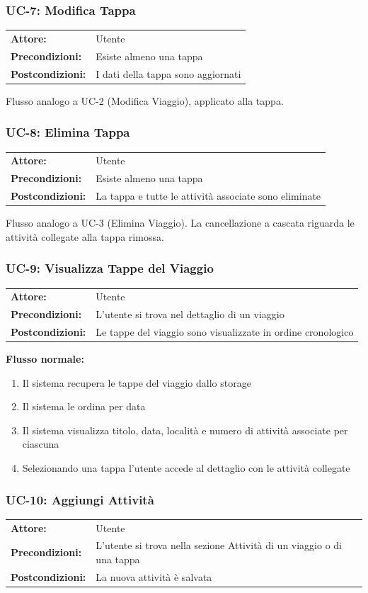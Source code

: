 \documentclass[12pt, a4paper]{article}
\makeatletter
\newcommand{\ucblock}[3]{%
  \noindent
  \begin{tabular}{@{}ll@{}}
    \textbf{Attore:}         & #1 \\
    \textbf{Precondizioni:}  & #2 \\
    \textbf{Postcondizioni:} & #3 \\
  \end{tabular}%
  \medskip
}
\makeatother
\begin{document}
\subsubsection{UC-7: Modifica Tappa}

\ucblock{Utente}{Esiste almeno una tappa}{I dati della tappa sono aggiornati}

\noindent Flusso analogo a UC-2 (Modifica Viaggio), applicato alla tappa.

\subsubsection{UC-8: Elimina Tappa}

\ucblock{Utente}{Esiste almeno una tappa}{La tappa e tutte le attività associate sono eliminate}

\noindent Flusso analogo a UC-3 (Elimina Viaggio). La cancellazione a cascata riguarda
le attività collegate alla tappa rimossa.

\subsubsection{UC-9: Visualizza Tappe del Viaggio}

\ucblock{Utente}{L'utente si trova nel dettaglio di un viaggio}{Le tappe del viaggio sono visualizzate in ordine cronologico}

\noindent\textbf{Flusso normale:}
\begin{enumerate}[leftmargin=1.5em, itemsep=1pt]
  \item Il sistema recupera le tappe del viaggio dallo storage
  \item Il sistema le ordina per data
  \item Il sistema visualizza titolo, data, località e numero di attività associate per ciascuna
  \item Selezionando una tappa l'utente accede al dettaglio con le attività collegate
\end{enumerate}

\subsubsection{UC-10: Aggiungi Attività}

\ucblock{Utente}{L'utente si trova nella sezione Attività di un viaggio o di una tappa}{La nuova attività è salvata}
\end{document}
